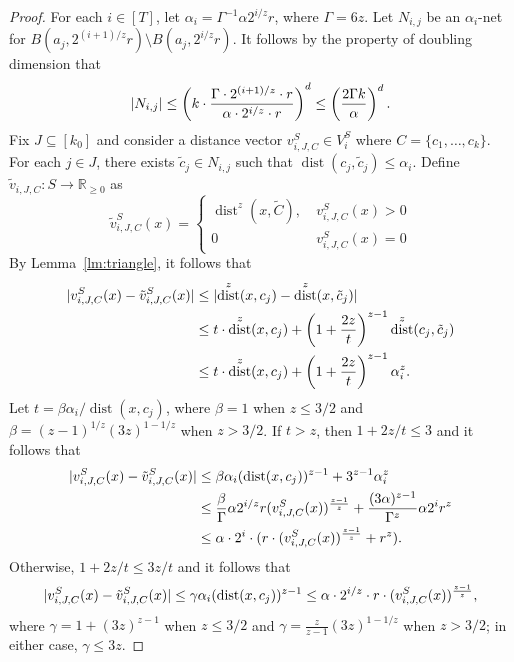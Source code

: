 \documentclass[11pt,letterpaper]{article}
\theoremstyle{definition}
\DeclareMathOperator{\dist}{dist}
\DeclarePairedDelimiter{\abs}{\lvert}{\rvert}
\begin{document}
\begin{proof}
%
For each $i\in [T]$, let $\alpha_i = \Gamma^{-1}\alpha 2^{i/z} r$, where $\Gamma = 6z$. Let $N_{i,j}$ be an $\alpha_i$-net for $B(a_j, 2^{(i+1)/z} r)\setminus B(a_j, 2^{i/z} r)$. It follows by the property of doubling dimension that
\[
    \abs{N_{i,j}}\leq 
    \left(k \cdot \frac{\Gamma\cdot 2^{(i+1)/z}\cdot r}{\alpha \cdot 2^{i/z}\cdot r} \right)^d
    \leq \left(\frac{2\Gamma k}{\alpha}\right)^{d}. 
\]
%
Fix $J\subseteq [k_0]$ and consider a distance vector $v_{i,J,C}^S\in V_i^S$ where $C=\{c_1,\dots,c_k\}$. For each $j\in J$, there exists $\tilde{c}_j \in N_{i,j}$ such that $\dist(c_j,\tilde{c}_j) \leq \alpha_i$. Define $\tilde{v}_{i,J,C}:S\rightarrow \mathbb{R}_{\geq 0}$ as
\[
    \tilde{v}_{i,J,C}^S(x)= 
    \begin{cases}
        \dist^z(x,\tilde{C}), \ &v_{i,J,C}^S(x) >0 \\
         0                      \ &v_{i,J,C}^S(x) =0 
    \end{cases}
\]
%
By Lemma~\ref{lm:triangle}, it follows that
\begin{align*}
    \abs{v_{i,J,C}^S(x) - \tilde{v}_{i,J,C}^S(x)}&\leq \abs{\dist^z(x,c_j)- \dist^z(x, \tilde{c}_j) }  \\
    &\leq t\cdot \dist^z(x,c_j) + \left(1 + \frac{2z}{t}\right)^{z-1}  \dist^z(c_j,\tilde{c}_j) \\
    &\leq t\cdot \dist^z(x,c_j) + \left(1 + \frac{2z}{t}\right)^{z-1}\alpha_i^z. 
\end{align*}
Let $t = \beta\alpha_i/\dist(x,c_j)$, where $\beta = 1$ when $z\leq 3/2$ and $\beta = (z-1)^{1/z}(3z)^{1-1/z}$ when $z>3/2$. 
If $t > z$, then $1+2z/t \leq 3$ and it follows that
\begin{align*}
    \abs{v_{i,J,C}^S(x) - \tilde{v}_{i,J,C}^S(x)} 
    &\leq \beta \alpha_i (\dist(x,c_j))^{z-1} + 3^{z-1} \alpha_i^z \\
    &\leq \frac{\beta}{\Gamma} \alpha 2^{i/z} r(v_{i,J,C}^S(x))^{\frac{z-1}{z}} + \frac{(3\alpha)^{z-1}}{\Gamma^z} \alpha 2^{i} r^z \\
    &\leq \alpha\cdot 2^{i}\cdot (r\cdot (v_{i,J,C}^S(x))^{\frac{z-1}{z}} + r^z).
\end{align*}
Otherwise, $1+2z/t \leq 3z/t$ and it follows that
\[    
    \abs{v_{i,J,C}^S(x) - \tilde{v}_{i,J,C}^S(x)} 
    \leq \gamma \alpha_i (\dist(x,c_j))^{z-1}  
    \leq \alpha\cdot 2^{i/z}\cdot r\cdot (v_{i,J,C}^S(x))^{\frac{z-1}{z}},
\]
where $\gamma = 1+(3z)^{z-1}$ when $z\leq 3/2$ and $\gamma = \frac{z}{z-1}(3z)^{1-1/z}$ when $z > 3/2$; in either case, $\gamma\leq 3z$.


\end{proof}
\end{document}
